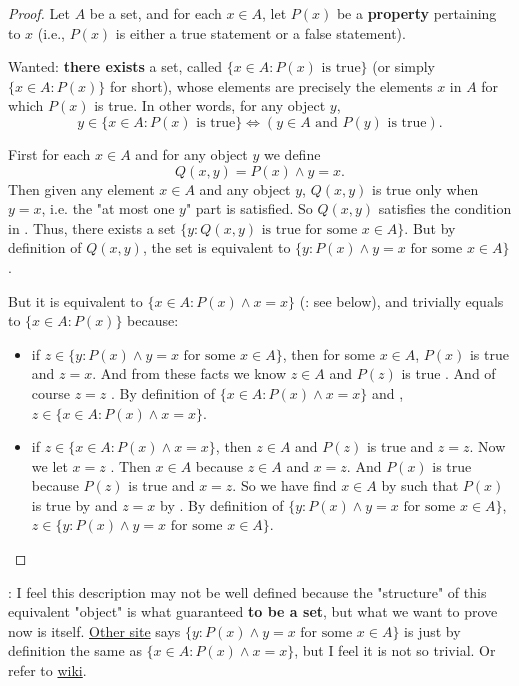 \begin{proof}
Let \(A\) be a set, and for each \(x \in A\), let \(P(x)\) be a \textbf{property} pertaining to \(x\) (i.e., \(P(x)\) is either a true statement or a false statement). 

Wanted: \textbf{there exists} a set, called \( \{ x \in A : P(x) \text{\ is true} \} \) (or simply \( \{ x \in A : P(x) \} \) for short), whose elements are precisely the elements \(x\) in \(A\) for which \(P(x)\) is true. In other words, for any object \(y\),
\[
    y \in \{ x \in A : P(x) \text{\ is true} \} \iff (y \in A \text{\ and \(P(y)\) is true}).
\]

First for each \(x \in A\) and for any object \(y\) we define
\[
    Q(x, y) = P(x) \land y = x.
\]
Then given any element \(x \in A\) and any object \(y\), \(Q(x, y)\) is true only when \(y = x\), i.e. the "at most one \(y\)" part is satisfied. So \(Q(x, y)\) satisfies the condition in . Thus, there exists a set \( \{y : Q(x, y) \text{\ is true for some\ } x \in A \}\). But by definition of \(Q(x, y)\), the set is equivalent to \( \{y : P(x) \land y = x \text{\ for some\ } x \in A \} \). 

But it is equivalent to \( \{x \in A : P(x) \land x = x \} \) (: see below), and trivially equals to \( \{x \in A : P(x)\} \)  because:
\begin{itemize}
    \item if \(z \in \{y : P(x) \land y = x \text{\ for some\ } x \in A \} \), then for some \(x \in A\), \(P(x)\) is true and \(z = x\). And from these facts we know \(z \in A\)  and \(P(z)\) is true . And of course \(z = z\) . By definition of \( \{x \in A : P(x) \land x = x \} \) and , \(z \in \{x \in A : P(x) \land x = x \} \).
    \item if \(z \in \{x \in A : P(x) \land x = x \} \), then \(z \in A\) and \(P(z)\) is true and \(z = z\). Now we let \(x = z\) . Then \(x \in A\)  because \(z \in A\) and \(x = z\). And \(P(x)\) is true  because \(P(z)\) is true and \(x = z\). So we have find \(x \in A\) by  such that \(P(x)\) is true by  and \(z = x\) by . By definition of \( \{y : P(x) \land y = x \text{\ for some\ } x \in A \} \), \(z \in \{y : P(x) \land y = x \text{\ for some\ } x \in A \} \).
\end{itemize}
\end{proof}

\begin{note}
: I feel this description may not be well defined because the "structure" of this equivalent "object" is what  guaranteed \textbf{to be a set}, but what we want to prove now is  itself. \href{https://math.stackexchange.com/questions/2107214/show-that-axiom-of-replacement-implies-from-the-axiom-of-specification-proof-ve}{Other site} says \( \{y : P(x) \land y = x \text{\ for some\ } x \in A \} \) is just by definition the same as \( \{x \in A : P(x) \land x = x \} \), but I feel it is not so trivial. Or refer to \href{https://www.wikiwand.com/en/Axiom_schema_of_specification#/Relation_to_the_axiom_schema_of_replacement}{wiki}.
\end{note}